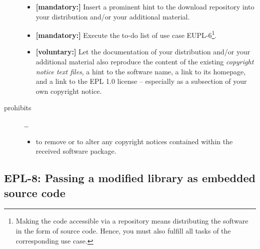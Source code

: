 \begin{description}
\begin{itemize}
  \item \textbf{[mandatory:]} Insert a prominent hint to the download repository
  into your distribution and/or your additional material.
  
  \item \textbf{[mandatory:]} Execute the to-do list of use case EUPL-6\footnote{
  Making the code accessible via a repository means distributing the software in
  the form of source code. Hence, you must also fulfill all tasks of the
  corresponding use case.}.
  
 
  \item \textbf{[voluntary:]} Let the documentation of your distribution and/or
  your additional material  also reproduce the content of the existing
  \emph{copyright notice text files}, a hint to the software name, a link to its
  homepage, and a link to the EPL 1.0 license -- especially as a subsection of
  your own copyright notice.
  
\end{itemize}

\item[prohibits] \ldots
\begin{itemize}
  \item to remove or to alter any copyright notices contained within the
  received software package.
\end{itemize}

\end{description}

\subsection{EPL-8: Passing a modified library as embedded source code}
\label{OSUC-10S-EPL}

